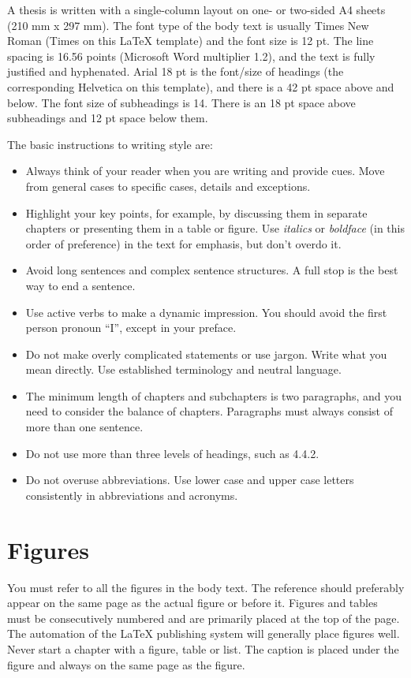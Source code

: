 \documentclass[twoside,draftfooter]{tutthesis} %
\begin{document}
A thesis is written with a single-column layout on one- or two-sided A4 sheets (210 mm x 297 mm).
The font type of the body text is usually Times New Roman (Times on this LaTeX template) and the font size is 12 pt.
The line spacing is 16.56 points (Microsoft Word multiplier 1.2), and the text is fully justified and hyphenated.
Arial 18 pt is the font/size of headings (the corresponding Helvetica on this template), and there is a 42 pt space above and below.
The font size of subheadings is 14.
There is an 18 pt space above subheadings and 12 pt space below them.

The basic instructions to writing style are:
\begin{itemize} %
  \item Always think of your reader when you are writing and provide cues. Move from general cases to specific cases, details and exceptions.
  \item Highlight your key points, for example, by discussing them in separate chapters or presenting them in a table or figure. Use \emph{italics} or \emph{boldface} (in this order of preference) in the text for emphasis, but don’t overdo it.
  \item Avoid long sentences and complex sentence structures. A full stop is the best way to end a sentence.
  \item Use active verbs to make a dynamic impression. You should avoid the first person pronoun ``I'', except in your preface.
  \item Do not make overly complicated statements or use jargon. Write what you mean directly. Use established terminology and neutral language.
  \item The minimum length of chapters and subchapters is two paragraphs, and you need to consider the balance of chapters.  Paragraphs must always consist of more than one sentence.
  \item Do not use more than three levels of headings, such as 4.4.2.
  \item Do not overuse abbreviations. Use lower case and upper case letters consistently in abbreviations and acronyms.
\end{itemize}

\section{Figures}

You must refer to all the figures in the body text.
The reference should preferably appear on the same page as the actual figure or before it.
Figures and tables must be consecutively numbered and are primarily placed at the top of the page.
The automation of the LaTeX publishing system will generally place figures well.
Never start a chapter with a figure, table or list.
The caption is placed under the figure and always on the same page as the figure.
\end{document}
